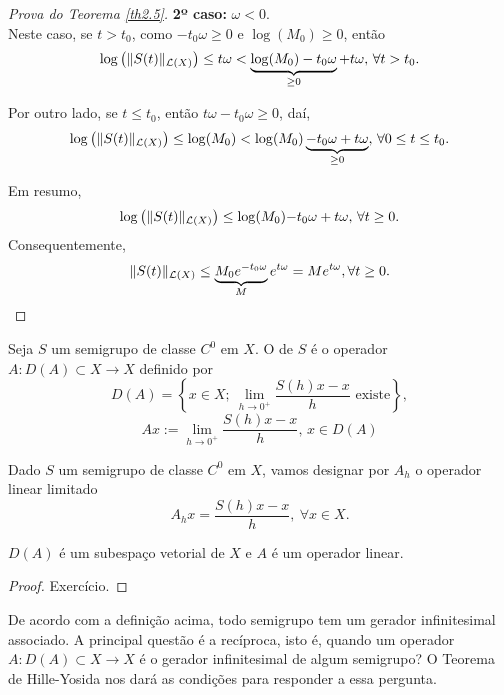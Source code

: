 \begin{proof}[Prova do Teorema \ref{th2.5}]
\noindent\textbf{2º caso:} $\omega< 0$.\\
Neste caso, se $t>t_0$, como $-t_0\omega\geq 0$ e $\log(M_0)\geq 0$, então
\begin{equation*}
\log\left(\|S(t)\|_{\mathcal{L}(X)}\right)\leq t\omega<\underbrace{\log(M_0)-t_0\omega}_{\geq 0}+t\omega, \, \forall t>t_0. 
\end{equation*}

Por outro lado, se $t\leq t_0$, então $t\omega-t_0\omega\geq 0$, daí,
\begin{equation*}
\log\left(\|S(t)\|_{\mathcal{L}(X)}\right)\leq \log(M_0)<\log(M_0)\underbrace{-t_0\omega+t\omega}_{\geq 0}, \, \forall 0\leq t\leq t_0. 
\end{equation*}

Em resumo,
\begin{equation*}
\log\left(\|S(t)\|_{\mathcal{L}(X)}\right)\leq \log(M_0){-t_0\omega+t\omega}, \, \forall t\geq 0. 
\end{equation*}
Consequentemente,
\begin{equation*}
    \|S(t)\|_{\mathcal{L}(X)}\leq \underbrace{M_0e^{-t_0\omega}}_{M}e^{t\omega}=Me^{t\omega}, \forall t\geq 0.
\end{equation*}
\end{proof}

\begin{definition}
    Seja $S$ um semigrupo de classe $C^0$ em $X$. O  de $S$ é o operador $A:D(A)\subset X\longrightarrow X$ definido por 
\[D(A)=\left\{x\in X;\ \lim\limits_{h\to 0^+} \frac{S(h)x-x}{h} \text{ existe}\right\},\]
\[Ax:=\lim\limits_{h\to 0^+} \frac{S(h)x-x}{h},\, x\in D(A)\]
\end{definition}

Dado $S$ um semigrupo de classe $C^0$ em $X$, vamos designar por $A_h$ o operador linear limitado 
    \[A_hx=\frac{S(h)x-x}{h},\ \forall x\in X.\]

\begin{proposition}
     $D(A)$ é um subespaço vetorial de $X$ e $A$ é um operador linear.
\end{proposition}
\begin{proof}
    Exercício.
\end{proof}


\begin{remark}
De acordo com a definição acima, todo semigrupo tem um gerador infinitesimal associado. A principal questão é a recíproca, isto é, {\color{blue} quando um operador $A:D(A)\subset X\longrightarrow X$ é o gerador infinitesimal de algum semigrupo?} O Teorema de Hille-Yosida nos dará as condições para responder a essa pergunta.
\end{remark}


